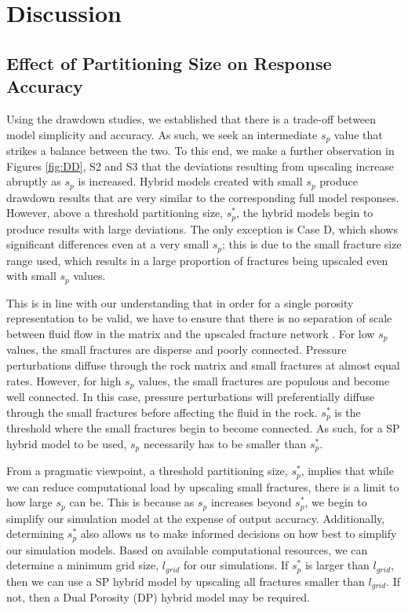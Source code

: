 \documentclass[draft]{agujournal2018}
\begin{document}
\section{Discussion}
\subsection{Effect of Partitioning Size on Response Accuracy}
Using the drawdown studies, we established that there is a trade-off between model simplicity and accuracy. As such, we seek an intermediate $s_p$ value that strikes a balance between the two. To this end, we make a further observation in Figures \ref{fig:DD}, S2 and S3 that the deviations resulting from upscaling increase abruptly as $s_p$ is increased. Hybrid models created with small $s_p$ produce drawdown results that are very similar to the corresponding full model responses. However, above a threshold partitioning size, $s_p^*$, the hybrid models begin to produce results with large deviations. The only exception is Case D, which shows significant differences even at a very small $s_p$; this is due to the small fracture size range used, which results in a large proportion of fractures being upscaled even with small $s_p$ values.

This is in line with our understanding that in order for a single porosity representation to be valid, we have to ensure that there is no separation of scale between fluid flow in the matrix and the upscaled fracture network \citep{Matthai2004a}. For low $s_p$ values, the small fractures are disperse and poorly connected. Pressure perturbations diffuse through the rock matrix and small fractures at almost equal rates. However, for high $s_p$ values, the small fractures are populous and become well connected. In this case, pressure perturbations will preferentially diffuse through the small fractures before affecting the fluid in the rock. $s_p^*$ is the threshold where the small fractures begin to become connected. As such, for a SP hybrid model to be used, $s_p$ necessarily has to be smaller than $s_p^*$.

From a pragmatic viewpoint, a threshold partitioning size, $s_p^*$, implies that while we can reduce computational load by upscaling small fractures, there is a limit to how large $s_p$ can be. This is because as $s_p$ increases beyond $s_p^*$, we begin to simplify our simulation model at the expense of output accuracy. Additionally, determining $s_p^*$ also allows us to make informed decisions on how best to simplify our simulation models. Based on available computational resources, we can determine a minimum grid size, $l_{grid}$ for our simulations. If $s_p^*$ is larger than $l_{grid}$, then we can use a SP hybrid model by upscaling all fractures smaller than $l_{grid}$. If not, then a Dual Porosity (DP) hybrid model may be required.
\end{document}
